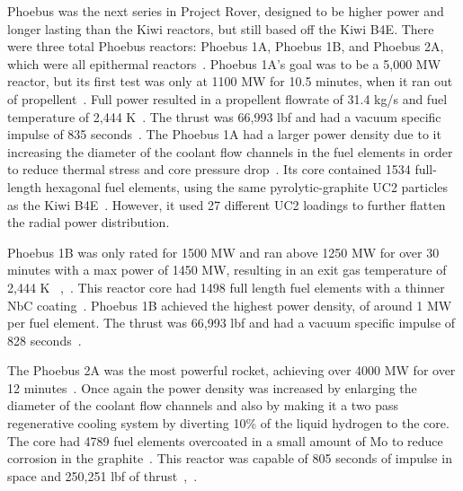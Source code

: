 \documentclass{article}
\begin{document}
Phoebus was the next series in Project Rover, designed to be higher power and longer lasting than the Kiwi reactors, but still based off the Kiwi B4E. There were three total Phoebus reactors: Phoebus 1A, Phoebus 1B, and Phoebus 2A, which were all epithermal reactors~\cite{finseth1991rover}. Phoebus 1A's goal was to be a 5,000 MW reactor, but its first test was only at 1100 MW for 10.5 minutes, when it ran out of propellent~\cite{gerrish2014nuclear}. Full power resulted in a propellent flowrate of 31.4 kg/s and fuel temperature of 2,444 K~\cite{finseth1991rover}. The thrust was 66,993 lbf and had a vacuum specific impulse of 835 seconds~\cite{presrovernerva}. The Phoebus 1A had a larger power density due to it increasing the diameter of the coolant flow channels in the fuel elements in order to reduce thermal stress and core pressure drop~\cite{finseth1991rover}. Its core contained 1534 full-length hexagonal fuel elements, using the same pyrolytic-graphite UC2 particles as the Kiwi B4E~\cite{finseth1991rover}. However, it used 27 different UC2 loadings to further flatten the radial power distribution.


Phoebus 1B was only rated for 1500 MW and ran above 1250 MW for over 30 minutes with a max power of 1450 MW, resulting in an exit gas temperature of 2,444 K ~\cite{finseth1991rover},~\cite{gerrish2014nuclear}. This reactor core had 1498 full length fuel elements with a thinner NbC coating~\cite{finseth1991rover}. Phoebus 1B achieved the highest power density, of around 1 MW per fuel element. The thrust was 66,993 lbf and had a vacuum specific impulse of 828 seconds~\cite{presrovernerva}.


The Phoebus 2A was the most powerful rocket, achieving over 4000 MW for over 12 minutes~\cite{gerrish2014nuclear}. Once again the power density was increased by enlarging the diameter of the coolant flow channels and also by making it a two pass regenerative cooling system by diverting 10\% of the liquid hydrogen to the core.~\cite{finseth1991rover} The core had 4789 fuel elements overcoated in a small amount of Mo to reduce corrosion in the graphite~\cite{finseth1991rover}. This reactor was capable of 805 seconds of impulse in space and 250,251 lbf of thrust~\cite{gerrish2014nuclear},~\cite{presrovernerva}. 
\end{document}
